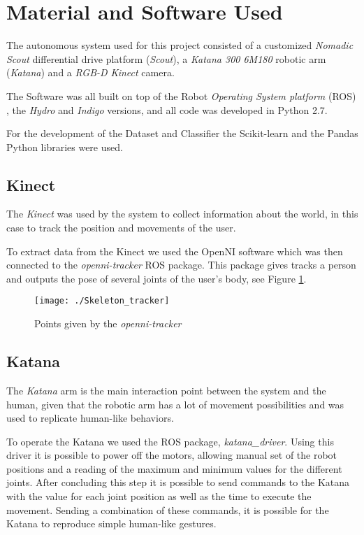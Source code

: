 
\section{Material and Software Used}
The autonomous system used for this project consisted of a customized \textit{Nomadic Scout} differential drive platform (\emph{Scout}), a  \textit{Katana 300 6M180} robotic arm (\textit{Katana}) and a \textit{RGB-D Kinect} camera.

The Software was all built on top of the Robot \textit{Operating System platform} (ROS) \cite{ROS}, the \textit{Hydro} and \textit{Indigo} versions, and all code was developed in Python 2.7.

For the development of the Dataset and Classifier the Scikit-learn \cite{Scikit-Learn} and the Pandas \cite{Pandas} Python libraries were used.	

\subsection{Kinect}
The \textit{Kinect} was used by the system to collect information about the world, in this case to track the position and movements of the user. 

To extract data from the Kinect we used the OpenNI software which was then connected to the  \textit{openni-tracker} ROS package. This package gives tracks a person and outputs the pose of several joints of the user's body, see Figure \ref{fig:skeleton_tracker}.

\begin{figure}[!h]
	\centering
		\texttt{[image: ./Skeleton\_tracker]}
	\caption{Points given by the \textit{openni-tracker}}\label{fig:skeleton_tracker}
\end{figure}

\subsection{Katana}\label{Material: Katana}
The \textit{Katana} arm is the main interaction point between the system and the human, given that the robotic arm has a lot of movement possibilities and was used to replicate human-like behaviors.

To operate the Katana we used the ROS package, \textit{katana\_driver}.  Using this driver it is possible to power off the motors, allowing manual set of the robot positions and a reading of the maximum and minimum values for the different joints. After concluding this step it is possible to send commands to the Katana with the value for each joint position as well as the time to execute the movement. Sending a combination of these commands, it is possible for the Katana to reproduce simple human-like gestures.

